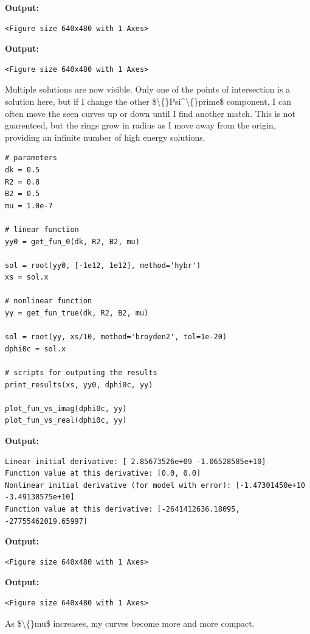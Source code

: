 \documentclass{article}
\begin{document}
\textbf{Output:}\begin{verbatim}
<Figure size 640x480 with 1 Axes>
\end{verbatim}

\textbf{Output:}\begin{verbatim}
<Figure size 640x480 with 1 Axes>
\end{verbatim}

Multiple solutions are now visible. Only one of the points of intersection is a solution here, but if I change the other \$\textbackslash\{\}Psi\textasciicircum{}\textbackslash\{\}prime\$ component, I can often move the seen curves up or down until I find another match. This is not guarenteed, but the rings grow in radius as I move away from the origin, providing an infinite number of high energy solutions.

\begin{lstlisting}
# parameters
dk = 0.5
R2 = 0.8
B2 = 0.5
mu = 1.0e-7

# linear function
yy0 = get_fun_0(dk, R2, B2, mu)

sol = root(yy0, [-1e12, 1e12], method='hybr')
xs = sol.x

# nonlinear function
yy = get_fun_true(dk, R2, B2, mu)

sol = root(yy, xs/10, method='broyden2', tol=1e-20)
dphi0c = sol.x

# scripts for outputing the results
print_results(xs, yy0, dphi0c, yy)

plot_fun_vs_imag(dphi0c, yy)
plot_fun_vs_real(dphi0c, yy)\end{lstlisting}

\textbf{Output:}\begin{verbatim}
Linear initial derivative: [ 2.85673526e+09 -1.06528585e+10]
Function value at this derivative: [0.0, 0.0]
Nonlinear initial derivative (for model with error): [-1.47301450e+10 -3.49138575e+10]
Function value at this derivative: [-2641412636.18095, -27755462019.65997]

\end{verbatim}

\textbf{Output:}\begin{verbatim}
<Figure size 640x480 with 1 Axes>
\end{verbatim}

\textbf{Output:}\begin{verbatim}
<Figure size 640x480 with 1 Axes>
\end{verbatim}

As \$\textbackslash\{\}mu\$ increases, my curves become more and more compact.
\end{document}
